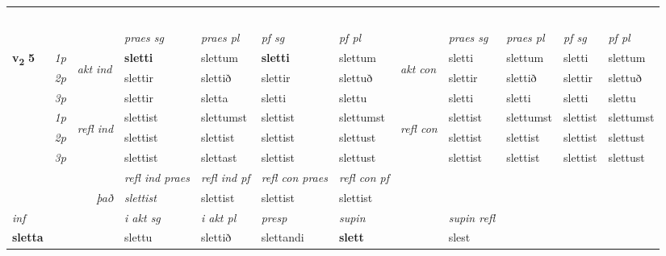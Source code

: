 \begin{longtable}[l]{X>{\footnotesize\itshape}llXXXXlXXXX}
\midrule
& \\*
& \\*
& \\*
& \\*
& \\
   \midrule
 & &   & \textit{praes sg}  & \textit{praes pl}    & \textit{ pf sg} & \textit{pf pl} & & \textit{praes sg}  & \textit{praes pl}    & \textit{pf sg} & \textit{pf pl }  \\ \cmidrule{4-7} \cmidrule{9-12}
 \multirow{2}{*}{{{\textbf{v{\textsubscript{2}}} \Large{\textbf{5}}}}}  & 1p & \multirow{3}{*}{\begin{turn}{90}\textit{akt ind}\end{turn}} & \textbf{sletti} & slettum & \textbf{sletti} & slettum & \multirow{3}{*}{\begin{turn}{90}\textit{akt con}\end{turn}} &sletti & slettum & sletti & slettum\\*
 & 2p &  &  slettir  & slettið & slettir & slettuð & & slettir & slettið & slettir & slettuð \\*
 & 3p &  & slettir & sletta & sletti & slettu & & sletti & sletti& sletti & slettu \\*
\cmidrule{4-7} \cmidrule{9-12}
 & 1p & \multirow{3}{*}{\begin{turn}{90}\textit{refl ind}\end{turn}}  & slettist & slettumst & slettist & slettumst & \multirow{3}{*}{\begin{turn}{90}\textit{refl con}\end{turn}}  &slettist & slettumst & slettist & slettumst \\*
 & 2p &  & slettist & slettist & slettist & slettust & &slettist & slettist & slettist & slettust \\*
 & 3p  & & slettist & slettast & slettist & slettust & & slettist & slettist& slettist & slettust \\*
\cmidrule{4-7} \cmidrule{9-12}

 & && \textit{refl ind praes} & \textit{refl ind pf} & \textit{refl con praes} & \textit{refl con pf} \\*
\multicolumn{3}{r}{\textit{það}}& slettist & slettist & slettist & slettist \\*

\cmidrule{4-7}
   {\textit{inf}} & &  & \textit{i akt sg} & \textit{i akt pl}   & \textit{presp} & \textit{supin} && \textit{supin refl}  \\*
  {\textbf{sletta}} & && slettu  & slettið   & slettandi &  \textbf{slett} && slest  \\*


\end{longtable}

